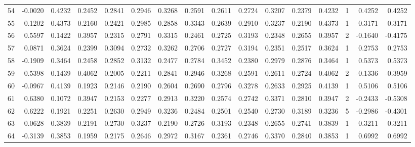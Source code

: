 \begin{tabular}{lrrrrrrrrrrrrrrr}
54  &     -0.0020 &  0.4232 &  0.2452 &  0.2841 &  0.2946 &  0.3268 &  0.2591 &  0.2611 &  0.2724 &  0.3207 &   0.2379 &     0.4232 &      1 &                    0.4252 &                     0.4252 \\
55  &      0.1202 &  0.4373 &  0.2160 &  0.2421 &  0.2985 &  0.2858 &  0.3343 &  0.2639 &  0.2910 &  0.3237 &   0.2190 &     0.4373 &      1 &                    0.3171 &                     0.3171 \\
56  &      0.5597 &  0.1422 &  0.3957 &  0.2315 &  0.2791 &  0.3315 &  0.2461 &  0.2725 &  0.3193 &  0.2348 &   0.2655 &     0.3957 &      2 &                   -0.1640 &                    -0.4175 \\
57  &      0.0871 &  0.3624 &  0.2399 &  0.3094 &  0.2732 &  0.3262 &  0.2706 &  0.2727 &  0.3194 &  0.2351 &   0.2517 &     0.3624 &      1 &                    0.2753 &                     0.2753 \\
58  &     -0.1909 &  0.3464 &  0.2458 &  0.2852 &  0.3132 &  0.2477 &  0.2784 &  0.3452 &  0.2380 &  0.2979 &   0.2876 &     0.3464 &      1 &                    0.5373 &                     0.5373 \\
59  &      0.5398 &  0.1439 &  0.4062 &  0.2005 &  0.2211 &  0.2841 &  0.2946 &  0.3268 &  0.2591 &  0.2611 &   0.2724 &     0.4062 &      2 &                   -0.1336 &                    -0.3959 \\
60  &     -0.0967 &  0.4139 &  0.1923 &  0.2146 &  0.2190 &  0.2604 &  0.2690 &  0.2796 &  0.3278 &  0.2633 &   0.2925 &     0.4139 &      1 &                    0.5106 &                     0.5106 \\
61  &      0.6380 &  0.1072 &  0.3947 &  0.2153 &  0.2277 &  0.2913 &  0.3220 &  0.2574 &  0.2742 &  0.3371 &   0.2810 &     0.3947 &      2 &                   -0.2433 &                    -0.5308 \\
62  &      0.6222 &  0.1921 &  0.2251 &  0.2630 &  0.2949 &  0.3236 &  0.2484 &  0.2501 &  0.2540 &  0.2730 &   0.3189 &     0.3236 &      5 &                   -0.2986 &                    -0.4301 \\
63  &      0.0628 &  0.3839 &  0.2191 &  0.2730 &  0.3237 &  0.2190 &  0.2726 &  0.3193 &  0.2348 &  0.2655 &   0.2741 &     0.3839 &      1 &                    0.3211 &                     0.3211 \\
64  &     -0.3139 &  0.3853 &  0.1959 &  0.2175 &  0.2646 &  0.2972 &  0.3167 &  0.2361 &  0.2746 &  0.3370 &   0.2840 &     0.3853 &      1 &                    0.6992 &                     0.6992 \\

\end{tabular}
